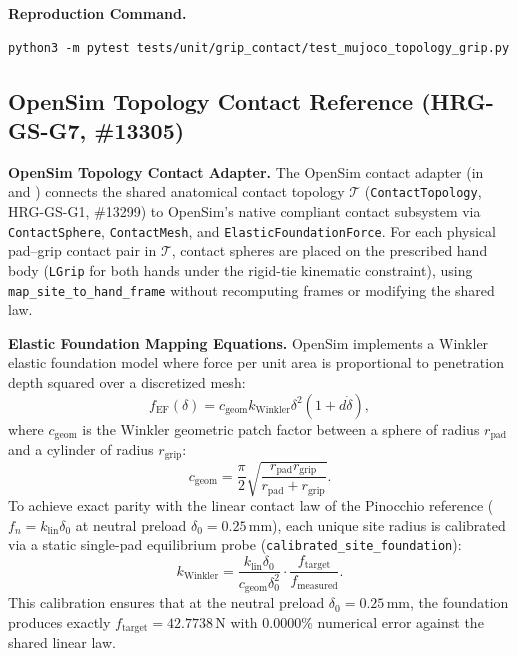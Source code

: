 \documentclass[11pt,a4paper]{article}
\begin{document}
\textbf{Reproduction Command.}
\begin{verbatim}
python3 -m pytest tests/unit/grip_contact/test_mujoco_topology_grip.py
\end{verbatim}

\subsection{OpenSim Topology Contact Reference (HRG-GS-G7, \#13305)}
\textbf{OpenSim Topology Contact Adapter.} The OpenSim contact adapter
(in  \\
 and ) connects the shared anatomical contact topology
$\mathcal{T}$ (\texttt{ContactTopology}, HRG-GS-G1, \#13299) to OpenSim's native
compliant contact subsystem via \texttt{ContactSphere}, \texttt{ContactMesh}, and
\texttt{ElasticFoundationForce}.
For each physical pad--grip contact pair in $\mathcal{T}$, contact spheres are placed on the
prescribed hand body (\texttt{LGrip} for both hands under the rigid-tie kinematic constraint),
using \texttt{map\_site\_to\_hand\_frame} without recomputing frames or modifying the shared law.

\textbf{Elastic Foundation Mapping Equations.} OpenSim implements a Winkler elastic foundation
model where force per unit area is proportional to penetration depth squared over a discretized
mesh:
\begin{equation}
f_{\mathrm{EF}}(\delta) = c_{\mathrm{geom}} k_{\mathrm{Winkler}} \delta^2 (1 + d \dot{\delta}),
\end{equation}
where $c_{\mathrm{geom}}$ is the Winkler geometric patch factor between a sphere of radius $r_{\mathrm{pad}}$
and a cylinder of radius $r_{\mathrm{grip}}$:
\begin{equation}
c_{\mathrm{geom}} = \frac{\pi}{2} \sqrt{\frac{r_{\mathrm{pad}} r_{\mathrm{grip}}}{r_{\mathrm{pad}} + r_{\mathrm{grip}}}}.
\end{equation}
To achieve exact parity with the linear contact law of the Pinocchio reference ($f_n = k_{\mathrm{lin}} \delta_0$
at neutral preload $\delta_0 = 0.25$\,mm), each unique site radius is calibrated via a static single-pad
equilibrium probe (\texttt{calibrated\_site\_foundation}):
\begin{equation}
k_{\mathrm{Winkler}} = \frac{k_{\mathrm{lin}} \delta_0}{c_{\mathrm{geom}} \delta_0^2} \cdot \frac{f_{\mathrm{target}}}{f_{\mathrm{measured}}}.
\end{equation}
This calibration ensures that at the neutral preload $\delta_0 = 0.25$\,mm, the foundation produces exactly
$f_{\mathrm{target}} = 42.7738$\,N with $0.0000\%$ numerical error against the shared linear law.
\end{document}
